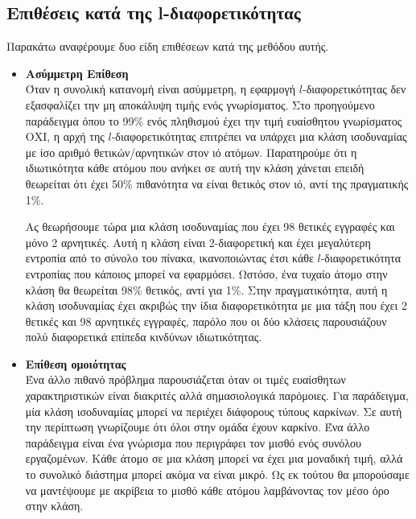  \subsection{Επιθέσεις κατά της \textlatin{l}-διαφορετικότητας}
 
 Παρακάτω αναφέρουμε δυο είδη επιθέσεων κατά της μεθόδου αυτής.
 \begin{itemize}
     \item \textbf{Ασύμμετρη Επίθεση}\\
     Όταν η συνολική κατανομή είναι ασύμμετρη, η εφαρμογή $l$-διαφορετικότητας δεν εξασφαλίζει την μη αποκάλυψη τιμής ενός γνωρίσματος. Στο προηγούμενο παράδειγμα όπου το 99\% ενός πληθισμού έχει την τιμή ευαίσθητου γνωρίσματος ΟΧΙ, η αρχή της $l$-διαφορετικότητας επιτρέπει να υπάρχει μια κλάση ισοδυναμίας με ίσο αριθμό θετικών/αρνητικών στον ιό ατόμων. Παρατηρούμε ότι η ιδιωτικότητα κάθε ατόμου που ανήκει σε αυτή την κλάση χάνεται επειδή θεωρείται ότι έχει 50\% πιθανότητα να είναι θετικός στον ιό, αντί της πραγματικής 1\%.
     
     Ας θεωρήσουμε τώρα μια κλάση ισοδυναμίας που έχει 98 θετικές εγγραφές και μόνο 2 αρνητικές. Αυτή η κλάση είναι 2-διαφορετική και έχει μεγαλύτερη εντροπία από το σύνολο του πίνακα,   ικανοποιώντας έτσι κάθε $l$-διαφορετικότητα εντροπίας που κάποιος μπορεί να εφαρμόσει. Ωστόσο, ένα τυχαίο άτομο στην κλάση θα θεωρείται 98\% θετικός, αντί για 1\%. Στην πραγματικότητα, αυτή η κλάση ισοδυναμίας έχει ακριβώς την ίδια διαφορετικότητα με μια τάξη που έχει 2 θετικές και 98 αρνητικές εγγραφές, παρόλο που οι δύο κλάσεις παρουσιάζουν πολύ διαφορετικά επίπεδα κινδύνων ιδιωτικότητας.
     
     
     \item \textbf{Επίθεση ομοιότητας}\\
     Ένα άλλο πιθανό πρόβλημα παρουσιάζεται όταν οι τιμές ευαίσθητων χαρακτηριστικών είναι διακριτές αλλά σημασιολογικά παρόμοιες. Για παράδειγμα, μία κλάση ισοδυναμίας μπορεί να περιέχει διάφορους τύπους καρκίνων. Σε αυτή την περίπτωση γνωρίζουμε ότι όλοι στην ομάδα έχουν καρκίνο. Ένα άλλο παράδειγμα είναι ένα γνώρισμα που περιγράφει τον μισθό ενός συνόλου εργαζομένων. Κάθε άτομο σε μια κλάση μπορεί να έχει μια μοναδική τιμή, αλλά το συνολικό διάστημα μπορεί ακόμα να είναι μικρό. Ως εκ τούτου θα μπορούσαμε να μαντέψουμε με ακρίβεια το μισθό κάθε ατόμου λαμβάνοντας τον μέσο όρο στην κλάση.


 \end{itemize}









